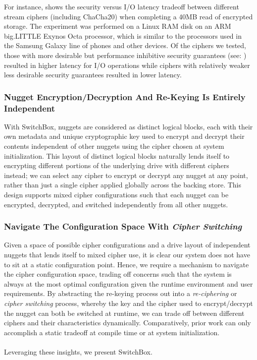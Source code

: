 For instance,  shows the security versus I/O latency
tradeoff between different stream ciphers (including ChaCha20) when completing a
40MB read of encrypted storage. The experiment was performed on a Linux RAM disk
on an ARM big.LITTLE Exynos Octa processor, which is similar to the processors
used in the Samsung Galaxy line of phones and other devices. Of the ciphers we
tested, those with more desirable but performance inhibitive security guarantees
(see: ) resulted in higher latency for I/O operations while
ciphers with relatively weaker less desirable security guarantees resulted in
lower latency.

\subsubsection{Nugget Encryption/Decryption And Re-Keying Is Entirely Independent}

With SwitchBox, nuggets are considered as distinct logical blocks, each with
their own metadata and unique cryptographic key used to encrypt and decrypt
their contents independent of other nuggets using the cipher chosen at system
initialization. This layout of distinct logical blocks naturally lends itself to
encrypting different portions of the underlying drive with different ciphers
instead; we can select any cipher to encrypt or decrypt any nugget at any point,
rather than just a single cipher applied globally across the backing store. This
design supports mixed cipher configurations such that each nugget can be encrypted,
decrypted, and switched independently from all other nuggets.

\subsubsection{Navigate The Configuration Space With \emph{Cipher Switching}}

Given a space of possible cipher configurations and a drive layout of
independent nuggets that lends itself to mixed cipher use, it is clear our
system does not have to sit at a static configuration point. Hence, we require a
mechanism to navigate the cipher configuration space, trading off concerns such
that the system is always at the most optimal configuration given the runtime
environment and user requirements. By abstracting the re-keying process out into a \emph{re-ciphering}
or \emph{cipher switching} process, whereby the key and the cipher used to
encrypt/decrypt the nugget can both be switched at runtime, we can trade off
between different ciphers and their characteristics dynamically. Comparatively,
prior work can only accomplish a static tradeoff at compile time or at system
initialization. \\
\\
Leveraging these insights, we present SwitchBox. 

